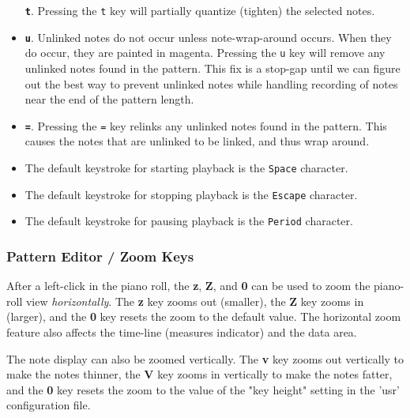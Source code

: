 \begin{itemize}
         \textbf{\texttt{t}}.
         Pressing the \texttt{t} key will partially quantize (tighten)
         the selected notes.
      \item
         \textbf{\texttt{u}}.
         Unlinked notes do not occur unless note-wrap-around occurs.
         When they do occur, they are painted in magenta.
         Pressing the \texttt{u} key will remove any unlinked notes found in
         the pattern.
         This fix is a stop-gap until we can figure out
         the best way to prevent unlinked notes while handling recording of
         notes near the end of the pattern length.
      \item
         \textbf{\texttt{=}}.
         Pressing the \texttt{=} key relinks any unlinked notes found in
         the pattern. This causes the notes that are unlinked to be linked, and
         thus wrap around.
      \item
         The default keystroke for starting playback is the \texttt{Space}
         character.
      \item
         The default keystroke for stopping playback is the \texttt{Escape}
         character.
      \item
         The default keystroke for pausing playback is the \texttt{Period}
         character.
   \end{itemize}

\subsubsection{Pattern Editor / Zoom Keys}
\label{subsubsec:pattern_editor_zoom_keys}

   After a left-click in the piano roll, the
   \textbf{z}, \textbf{Z}, and \textbf{0}
   can be used to zoom the piano-roll view \textsl{horizontally}.
   The \textbf{z} key zooms out (smaller),
   the \textbf{Z} key zooms in (larger),
   and the \textbf{0} key resets the zoom to the default value.
   The horizontal zoom feature also affects the time-line
   (measures indicator) and the data area.

   The note display can also be zoomed vertically.
   The \textbf{v} key zooms out vertically to make the notes thinner,
   the \textbf{V} key zooms in vertically to make the notes fatter,
   and the \textbf{0} key resets the zoom to the value of the "key height"
   setting in the 'usr' configuration file.
   
